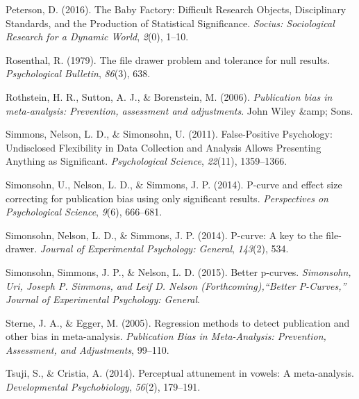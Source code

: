 \documentclass[american,floatsintext,man]{apa6}
\begin{document}
Peterson, D. (2016). The Baby Factory: Difficult Research Objects,
Disciplinary Standards, and the Production of Statistical Significance.
\emph{Socius: Sociological Research for a Dynamic World}, \emph{2}(0),
1--10.

Rosenthal, R. (1979). The file drawer problem and tolerance for null
results. \emph{Psychological Bulletin}, \emph{86}(3), 638.

Rothstein, H. R., Sutton, A. J., \& Borenstein, M. (2006).
\emph{Publication bias in meta-analysis: Prevention, assessment and
adjustments}. John Wiley \&amp; Sons.

Simmons, Nelson, L. D., \& Simonsohn, U. (2011). False-Positive
Psychology: Undisclosed Flexibility in Data Collection and Analysis
Allows Presenting Anything as Significant. \emph{Psychological Science},
\emph{22}(11), 1359--1366.

Simonsohn, U., Nelson, L. D., \& Simmons, J. P. (2014). P-curve and
effect size correcting for publication bias using only significant
results. \emph{Perspectives on Psychological Science}, \emph{9}(6),
666--681.

Simonsohn, Nelson, L. D., \& Simmons, J. P. (2014). P-curve: A key to
the file-drawer. \emph{Journal of Experimental Psychology: General},
\emph{143}(2), 534.

Simonsohn, Simmons, J. P., \& Nelson, L. D. (2015). Better p-curves.
\emph{Simonsohn, Uri, Joseph P. Simmons, and Leif D. Nelson
(Forthcoming),``Better P-Curves,'' Journal of Experimental Psychology:
General}.

Sterne, J. A., \& Egger, M. (2005). Regression methods to detect
publication and other bias in meta-analysis. \emph{Publication Bias in
Meta-Analysis: Prevention, Assessment, and Adjustments}, 99--110.

Tsuji, S., \& Cristia, A. (2014). Perceptual attunement in vowels: A
meta-analysis. \emph{Developmental Psychobiology}, \emph{56}(2),
179--191.
\end{document}
